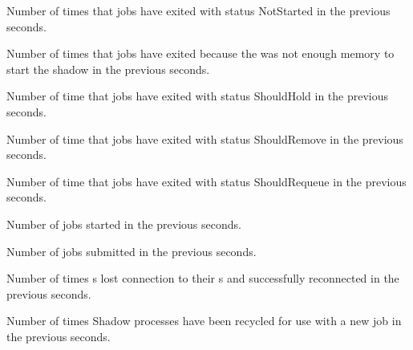 \begin{description}
\item[\AdAttr{RecentJobsNotStarted}:] Number of times that jobs have exited with status NotStarted
  in the previous  seconds.

\item[\AdAttr{RecentJobsShadowNoMemory}:] Number of times that jobs have exited because the was not enough memory to start the shadow
  in the previous  seconds.

\item[\AdAttr{RecentJobsShouldHold}:] Number of time that jobs have exited with status ShouldHold
  in the previous  seconds.

\item[\AdAttr{RecentJobsShouldRemove}:] Number of time that jobs have exited with status ShouldRemove
  in the previous  seconds.

\item[\AdAttr{RecentJobsShouldRequeue}:] Number of time that jobs have exited with status ShouldRequeue
  in the previous  seconds.

\item[\AdAttr{RecentJobsStarted}:] Number of jobs started
  in the previous  seconds.

\item[\AdAttr{RecentJobsSubmitted}:] Number of jobs submitted
  in the previous  seconds.

\item[\AdAttr{RecentShadowsReconnections}:] Number of times s lost 
  connection to their s and successfully reconnected
  in the previous  seconds.
  
\item[\AdAttr{RecentShadowsRecycled}:] Number of times Shadow processes have been 
  recycled for use with a new job
  in the previous  seconds.


\end{description}
